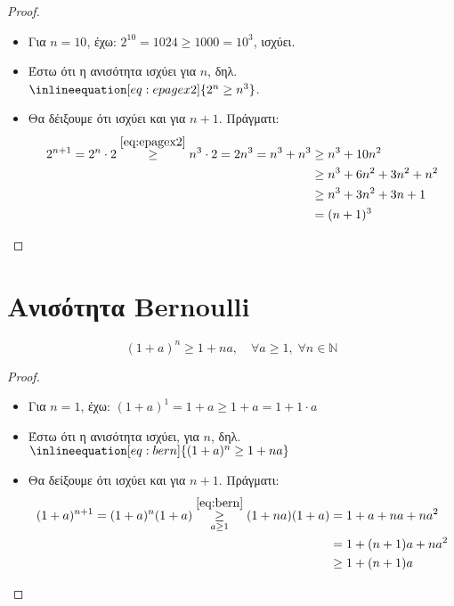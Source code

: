 \documentclass[main.tex]{subfiles}
\begin{document}
\begin{proof}
\item {}
    \begin{itemize}
        \item Για $ n=10 $, έχω: $ 2^{10} = 1024 \geq 1000 = 10^{3}  $, 
            ισχύει.
        \item Έστω ότι η ανισότητα ισχύει για $n$, δηλ. 
            $\inlineequation[eq:epagex2]{2^{n} \geq n^{3}}$.
        \item Θα δέιξουμε ότι ισχύει και για $ n+1 $. Πράγματι:
            \begin{align*}
                2^{n+1} = 2^{n} \cdot 2 \overset{\eqref{eq:epagex2}}{\geq} n^{3} 
                \cdot 2 = 2n^{3} = n^{3} + n^{3} &\geq n^{3} + 10n^{2} \\
                                                 &\geq n^{3} + 6n^{2} + 3n^{2} 
                                                 + n^{2} \\ 
                                                 &\geq n^{3} + 3n^{2} + 3n + 1 \\ 
                                                 &= (n+1)^{3}
            \end{align*} 
    \end{itemize}
\end{proof}

\section{Ανισότητα Bernoulli}
\[
    \boxed{(1+a)^{n} \geq 1 + na, \quad \forall a \geq 1, \; \forall n \in
    \mathbb{N}}
\] 


\begin{proof}
    \begin{itemize}
        \item Για $ n=1 $, έχω: $ (1+a)^{1} = 1+a \geq 1+a = 1 + 1 \cdot a $
        \item Έστω ότι η ανισότητα ισχύει, για $ n $, δηλ. $\inlineequation[eq:bern]
            {(1+a)^{n} \geq 1 + na}$
        \item Θα δείξουμε ότι ισχύει και για $ n+1 $. Πράγματι:
            \begin{align*}
                (1+a)^{n+1} = (1+a)^{n}(1+a) \overset{\eqref{eq:bern}}
                {\underset{a \geq 1}{\geq}}
                (1+na)(1+a) &= 1 + a + na + na^{2} \\
                            &= 1 + (n+1)a + na^{2} \\
                            &\geq 1 + (n+1)a
            \end{align*}

    \end{itemize}
\end{proof}
\end{document}
